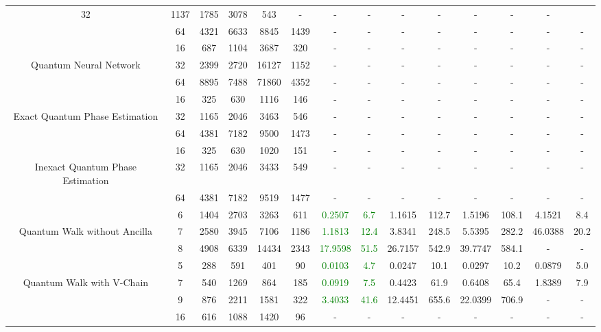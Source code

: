 \begin{table}[htb]
{\begin{tabular}{|c|c|c|c|c|c|c|c|c|c|c|c|c|c|}
32 & 1137 & 1785 & 3078 & 543
 & - & -
 & - & -
 & - & -
 & - & -
 \\
 & 
64 & 4321 & 6633 & 8845 & 1439
 & - & -
 & - & -
 & - & -
 & - & -
 \\
\hline
 & 
16 & 687 & 1104 & 3687 & 320
 & - & -
 & - & -
 & - & -
 & - & -
 \\
Quantum Neural Network & 
32 & 2399 & 2720 & 16127 & 1152
 & - & -
 & - & -
 & - & -
 & - & -
 \\
 & 
64 & 8895 & 7488 & 71860 & 4352
 & - & -
 & - & -
 & - & -
 & - & -
 \\
\hline
 & 
16 & 325 & 630 & 1116 & 146
 & - & -
 & - & -
 & - & -
 & - & -
 \\
Exact Quantum Phase Estimation & 
32 & 1165 & 2046 & 3463 & 546
 & - & -
 & - & -
 & - & -
 & - & -
 \\
 & 
64 & 4381 & 7182 & 9500 & 1473
 & - & -
 & - & -
 & - & -
 & - & -
 \\
\hline
 & 
16 & 325 & 630 & 1020 & 151
 & - & -
 & - & -
 & - & -
 & - & -
 \\
Inexact Quantum Phase Estimation & 
32 & 1165 & 2046 & 3433 & 549
 & - & -
 & - & -
 & - & -
 & - & -
 \\
 & 
64 & 4381 & 7182 & 9519 & 1477
 & - & -
 & - & -
 & - & -
 & - & -
 \\
\hline
 & 
6 & 1404 & 2703 & 3263 & 611
 & \textcolor{green}{0.2507} & \textcolor{green}{6.7}
 & 1.1615 & 112.7
 & 1.5196 & 108.1
 & 4.1521 & 8.4
 \\
Quantum Walk without Ancilla & 
7 & 2580 & 3945 & 7106 & 1186
 & \textcolor{green}{1.1813} & \textcolor{green}{12.4}
 & 3.8341 & 248.5
 & 5.5395 & 282.2
 & 46.0388 & 20.2
 \\
 & 
8 & 4908 & 6339 & 14434 & 2343
 & \textcolor{green}{17.9598} & \textcolor{green}{51.5}
 & 26.7157 & 542.9
 & 39.7747 & 584.1
 & - & -
 \\
\hline
 & 
5 & 288 & 591 & 401 & 90
 & \textcolor{green}{0.0103} & \textcolor{green}{4.7}
 & 0.0247 & 10.1
 & 0.0297 & 10.2
 & 0.0879 & 5.0
 \\
Quantum Walk with V-Chain & 
7 & 540 & 1269 & 864 & 185
 & \textcolor{green}{0.0919} & \textcolor{green}{7.5}
 & 0.4423 & 61.9
 & 0.6408 & 65.4
 & 1.8389 & 7.9
 \\
 & 
9 & 876 & 2211 & 1581 & 322
 & \textcolor{green}{3.4033} & \textcolor{green}{41.6}
 & 12.4451 & 655.6
 & 22.0399 & 706.9
 & - & -
 \\
\hline
 & 
16 & 616 & 1088 & 1420 & 96
 & - & -
 & - & -
 & - & -
 & - & -
 \\

\end{tabular}}
\end{table}
